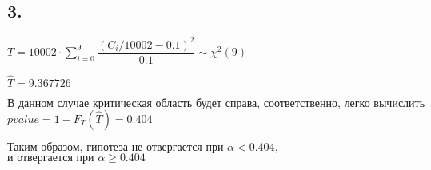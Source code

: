 \documentclass[13pt,a4paper]{scrartcl}
\def\suml{\sum\limits}
\def\a{\alpha}
\begin{document}
\subsection*{ 3.}

\def\delim{C_i / 10002}

\(T = 10002\cdot  \suml_{i = 0}^{9} \dfrac{(\delim - 0.1)^2 }{0.1 } \sim  \chi^2(9)\)

\(\hat T = 9.367726\)

\(\text{В }\allowbreak \text{данном }\allowbreak \text{случае }\allowbreak \text{критическая }\allowbreak \text{область }\allowbreak \text{будет }\allowbreak \text{справа, }\allowbreak \text{соответственно, }\allowbreak \text{легко }\allowbreak \text{вычислить}\allowbreak \)
\(pvalue = 1 - F_T(\hat T) = 0.404\)

\(\text{Таким }\allowbreak \text{образом, }\allowbreak \text{гипотеза }\allowbreak \text{не }\allowbreak \text{отвергается }\allowbreak \text{при }\allowbreak \a < 0.404,\)
\(\text{и }\allowbreak \text{отвергается }\allowbreak \text{при }\allowbreak \a \ge  0.404\)
\end{document}
